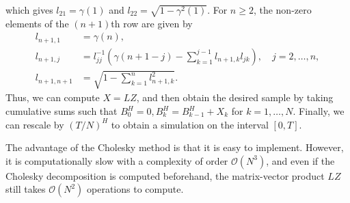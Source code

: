which gives $l_{21}=\gamma(1)$ and $l_{22}=\sqrt{1-\gamma^{2}(1)}$. For $n\geq 2$, the non-zero elements of the $(n+1)$th row are given by
\begin{align*}
    l_{n+1,1}&=\gamma(n),\\
    l_{n+1,j}&=l_{jj}^{-1}\left(\gamma(n+1-j)-\sum_{k=1}^{j-1}l_{n+1,k}l_{jk}\right),\quad j=2,\dots,n,\\
    l_{n+1,n+1}&= \sqrt{1-\sum_{k=1}^{n}l_{n+1,k}^{2}}.
\end{align*}
Thus, we can compute $X=LZ$, and then obtain the desired sample by taking cumulative sums such that $B_{0}^{H}=0, B_{k}^{H}=B_{k-1}^{H}+X_{k}$ for $k=1,\dots,N$. Finally, we can rescale by $(T/N)^H$ to obtain a simulation on the interval $[0,T]$.

The advantage of the Cholesky method is that it is easy to implement. However, it is computationally slow with a complexity of order $\mathcal{O}(N^{3})$, and even if the Cholesky decomposition is computed beforehand, the matrix-vector product $LZ$ still takes $\mathcal{O}(N^2)$ operations to compute.
